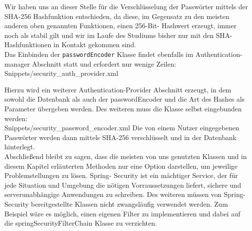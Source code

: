 Wir haben uns an dieser Stelle für die Verschlüsselung der Passwörter mittels der SHA-256 Hashfunktion 
entschieden, da diese, im Gegensatz zu den meisten anderen oben genannten Funktionen, einen 256-Bit-
Hashwert erzeugt, immer noch als stabil gilt und wir im Laufe des Studiums bisher nur mit den SHA-
Hashfunktionen in Kontakt gekommen sind. \\
Das Einbinden der \texttt{passwordEncoder} Klasse findet ebenfalls im Authentication-manager Abschnitt statt 
und erfordert nur wenige Zeilen: \\

{Snippets/security_auth_provider.xml} \newpage

Hierzu wird ein weiterer Authentication-Provider Abschnitt erzeugt, in dem sowohl die Datenbank als 
auch der passwordEncoder und die Art des Hashes als Parameter übergeben werden. Des weiteren muss die 
Klasse selbst eingebunden werden: \\

{Snippets/security_password_encoder.xml}
\bigskip 
Die von einem Nutzer eingegebenen Passwörter werden dann mittels SHA-256 verschlüsselt und in der 
Datenbank hinterlegt. \\
Abschließend bleibt zu sagen, dass die meisten von uns genutzten Klassen und in diesem Kapitel 
erläuterten Methoden nur eine Option darstellen, um jeweilige Problemstellungen zu lösen. Spring-
Security ist ein mächtiger Service, der für jede Situation und Umgebung die nötigen Vorraussetzungen 
liefert, sichere und serverunabhängige Anwendungen zu schreiben. Des weiteren müssen von Spring-
Security bereitgestellte Klassen nicht zwangsläufig verwendet werden. Zum Beispiel wäre es möglich, 
einen eigenen Filter zu implementieren und dabei auf die springSecurityFilterChain Klasse zu 
verzichten.









